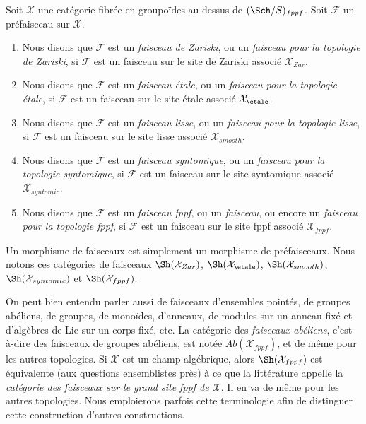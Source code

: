\begin{definition}
\label{definition-sheaves}
Soit $\mathcal{X}$ une catégorie fibrée en groupoïdes au-dessus de
$(\Sch/S)_{fppf}$. Soit $\mathcal{F}$ un préfaisceau sur $\mathcal{X}$.
\begin{enumerate}
\item Nous disons que $\mathcal{F}$ est un {\it faisceau de Zariski}, ou un
{\it faisceau pour la topologie de Zariski}, si $\mathcal{F}$
est un faisceau sur le site de Zariski associé $\mathcal{X}_{Zar}$.
\item Nous disons que $\mathcal{F}$ est un {\it faisceau \'etale}, ou un
{\it faisceau pour la topologie \'etale}, si $\mathcal{F}$
est un faisceau sur le site \'etale associé $\mathcal{X}_\etale$.
\item Nous disons que $\mathcal{F}$ est un {\it faisceau lisse}, ou un
{\it faisceau pour la topologie lisse}, si $\mathcal{F}$
est un faisceau sur le site lisse associé $\mathcal{X}_{smooth}$.
\item Nous disons que $\mathcal{F}$ est un {\it faisceau syntomique}, ou un
{\it faisceau pour la topologie syntomique}, si $\mathcal{F}$
est un faisceau sur le site syntomique associé $\mathcal{X}_{syntomic}$.
\item Nous disons que $\mathcal{F}$ est un {\it faisceau fppf}, ou un {\it faisceau},
ou encore un {\it faisceau pour la topologie fppf}, si $\mathcal{F}$
est un faisceau sur le site fppf associé $\mathcal{X}_{fppf}$.
\end{enumerate}
Un morphisme de faisceaux est simplement un morphisme de préfaisceaux. Nous notons
ces catégories de faisceaux
$\Sh(\mathcal{X}_{Zar})$,
$\Sh(\mathcal{X}_\etale)$,
$\Sh(\mathcal{X}_{smooth})$,
$\Sh(\mathcal{X}_{syntomic})$ et
$\Sh(\mathcal{X}_{fppf})$.
\end{definition}

\noindent
On peut bien entendu parler aussi de faisceaux d'ensembles pointés, de groupes abéliens,
de groupes, de monoïdes, d'anneaux, de modules sur un anneau fixé et d'algèbres de Lie sur
un corps fixé, etc. La catégorie des {\it faisceaux abéliens}, c'est-à-dire des faisceaux
de groupes abéliens, est notée $\textit{Ab}(\mathcal{X}_{fppf})$,
et de même pour les autres topologies. Si $\mathcal{X}$ est un champ
algébrique, alors $\Sh(\mathcal{X}_{fppf})$ est équivalente (aux
questions ensemblistes près) à ce que la littérature appelle
la {\it catégorie des faisceaux sur le grand site fppf de $\mathcal{X}$}. Il en va de même
pour les autres topologies. Nous emploierons parfois cette terminologie afin de
distinguer cette construction d'autres constructions.

